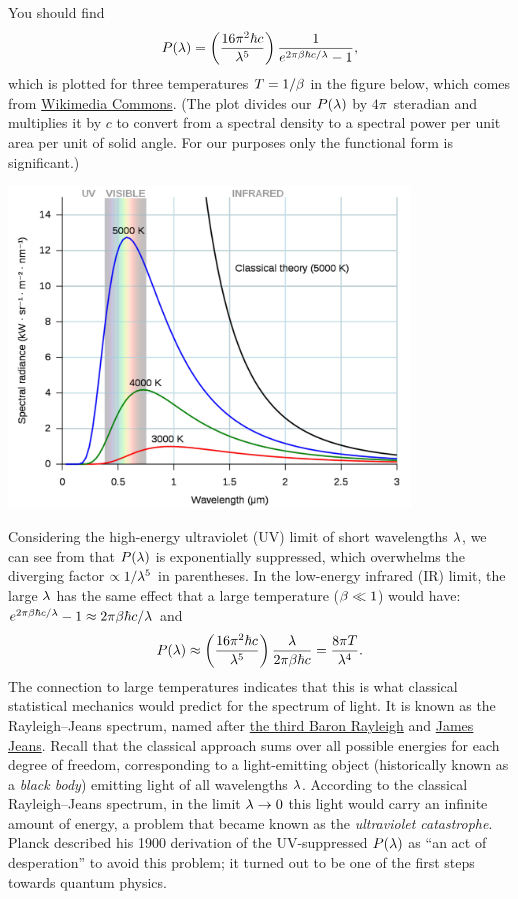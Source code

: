 You should find
\begin{equation}
  \label{eq:Planck_la}
  P(\lambda) = \left(\frac{16\pi^2 \hbar c}{\lambda^5}\right) \frac{1}{e^{2\pi\beta \hbar c / \lambda} - 1},
\end{equation}
which is plotted for three temperatures $T = 1 / \beta$ in the figure below, which comes from \href{https://commons.wikimedia.org/wiki/File:Black_body.svg}{Wikimedia Commons}.
(The plot divides our $P(\lambda)$ by $4\pi$~steradian and multiplies it by $c$ to convert from a spectral density to a spectral power per unit area per unit of solid angle.  For our purposes only the functional form is significant.) \\[-24 pt]
\begin{center}\includegraphics[width=0.8\textwidth]{figs/unit08_spectrum.pdf}\end{center}

Considering the high-energy ultraviolet (UV) limit of short wavelengths $\lambda$, we can see from  that $P(\lambda)$ is exponentially suppressed, which overwhelms the diverging factor $\propto 1 / \lambda^5$ in parentheses.
In the low-energy infrared (IR) limit, the large $\lambda$ has the same effect that a large temperature ($\beta \ll 1$) would have: $e^{2\pi\beta \hbar c / \lambda} - 1 \approx 2\pi\beta \hbar c / \lambda$ and
\begin{equation*}
  P(\lambda) \approx \left(\frac{16\pi^2 \hbar c}{\lambda^5}\right) \frac{\lambda}{2\pi\beta \hbar c} = \frac{8\pi T}{\lambda^4}.
\end{equation*}
The connection to large temperatures indicates that this is what classical statistical mechanics would predict for the spectrum of light.
It is known as the Rayleigh--Jeans spectrum, named after \href{https://en.wikipedia.org/wiki/John_William_Strutt,_3rd_Baron_Rayleigh}{the third Baron Rayleigh} and \href{https://en.wikipedia.org/wiki/James_Jeans}{James Jeans}.
Recall that the classical approach sums over all possible energies for each degree of freedom, corresponding to a light-emitting object (historically known as a \textit{black body}) emitting light of all wavelengths $\lambda$.
According to the classical Rayleigh--Jeans spectrum, in the limit $\lambda \to 0$ this light would carry an infinite amount of energy, a problem that became known as the \textit{ultraviolet catastrophe}.
Planck described his 1900 derivation of the UV-suppressed $P(\lambda)$ as ``an act of desperation'' to avoid this problem; it turned out to be one of the first steps towards quantum physics.

